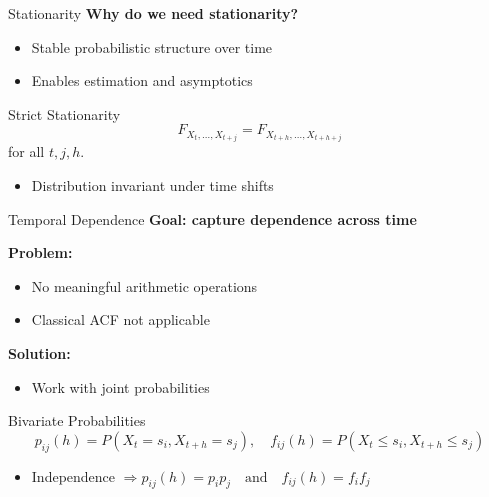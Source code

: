 \documentclass{beamer}
\begin{document}
\begin{frame}{Stationarity}
\textbf{Why do we need stationarity?}

\begin{itemize}
    \item Stable probabilistic structure over time
    \item Enables estimation and asymptotics
\end{itemize}

\vspace{0.5cm}

\begin{block}{Strict Stationarity}
\[
F_{X_t, \dots, X_{t+j}} = F_{X_{t+h}, \dots, X_{t+h+j}}
\]
for all $t, j, h$.
\end{block}

\vspace{0.3cm}

\begin{itemize}
    \item Distribution invariant under time shifts
\end{itemize}
\end{frame}




\begin{frame}{Temporal Dependence}
\textbf{Goal: capture dependence across time}

\vspace{0.3cm}

\textbf{Problem:}
\begin{itemize}
    \item No meaningful arithmetic operations
    \item Classical ACF not applicable
\end{itemize}

\vspace{0.5cm}

\textbf{Solution:}
\begin{itemize}
    \item Work with joint probabilities
\end{itemize}

\vspace{0.3cm}

\begin{block}{Bivariate Probabilities}
\[
p_{ij}(h) = P(X_t = s_i, X_{t+h} = s_j), \quad  f_{ij}(h) = P(X_t \leq s_i, X_{t+h} \leq s_j)
\]
\end{block}

\begin{itemize}
    \item Independence $\Rightarrow p_{ij}(h) = p_i p_j \quad \text{and} \quad  f_{ij}(h) = f_i f_j $
\end{itemize}
\end{frame}
\end{document}
